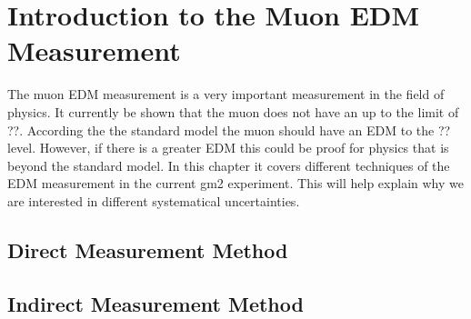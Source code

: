 \documentclass[./Thesis]{subfiles}
\begin{document}
\chapter{Introduction to the Muon EDM Measurement}
The muon EDM measurement is a very important measurement in the field of physics. It currently be shown that the muon does not have an up to the limit of ??. According the the standard model the muon should have an EDM to the ?? level. However, if there is a greater EDM this could be proof for physics that is beyond the standard model. In this chapter it covers different techniques of the EDM measurement in the current gm2 experiment. This will help explain why we are interested in different systematical uncertainties. 






\section{Direct Measurement Method}


\section{Indirect Measurement Method}
\end{document}
